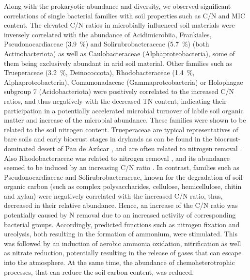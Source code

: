 Along with the prokaryotic abundance and diversity, we observed significant correlations of single bacterial families with soil properties such as C/N and MIC content. The elevated C/N ratios in microbially influenced soil materials were inversely correlated with the abundance of Acidimicrobiia, Frankiales, Pseudonocardiaceae (\SI{3.9}{\percent}) and Solirubrobacteraceae (\SI{5.7}{\percent}) (both Actinobacteriota) as well as Caulobacteraceae (Alphaproteobacteria), some of them being exclusively abundant in arid soil material. Other families such as Trueperaceae (\SI{3.2}{\percent}, Deinococcota), Rhodobacteraceae (\SI{1.4}{\percent}, Alphaproteobacteria), Comamonadaceae (Gammaproteobacteria) or Holophagae subgroup 7 (Acidobacteriota) were positively correlated to the increased C/N ratios, and thus negatively with the decreased TN content, indicating their participation in a potentially accelerated microbial turnover of labile soil organic matter and increase of the microbial abundance. These families were shown to be related to the soil nitrogen content. Trueperaceae are typical representatives of bare soils and early biocrust stages in drylands \citep{Albuquerque2005, Maier2018} as can be found in the biocrust-dominated desert of Pan de Az{\'u}car \citep{Bernhard2018}, and are often related to nitrogen removal \citep{GonzalezBlanco2020}. Also Rhodobacteraceae was related to nitrogen removal \citep{Jia2020}, and its abundance seemed to be induced by an increasing C/N ratio \citep{Guo2020}. In contrast, families such as Pseudonocardiaceae and Solirubrobacteraceae, known for the degradation of soil organic carbon (such as complex polysaccharides, cellulose, hemicellulose, chitin and xylan) \citep{Broadbent2022, Yeager2017} were negatively correlated with the increased C/N ratio, thus, decreased in their relative abundance. Hence, an increase of the C/N ratio was potentially caused by N removal due to an increased activity of corresponding bacterial groups. Accordingly, predicted functions such as nitrogen fixation and ureolysis, both resulting in the formation of ammonium, were stimulated. This was followed by an induction of aerobic ammonia oxidation, nitrification as well as nitrate reduction, potentially resulting in the release of gases that can escape into the atmosphere. At the same time, the abundance of chemoheterotrophic processes, that can reduce the soil carbon content, was reduced.

